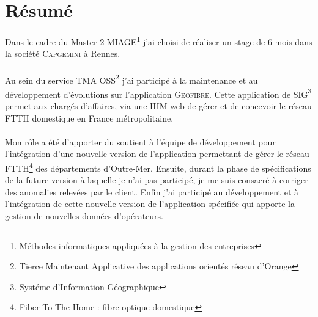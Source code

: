 \chapter*{Résumé}
Dans le cadre du Master 2 MIAGE\footnote{Méthodes informatiques appliquées à la gestion des entreprises}
 j'ai choisi de réaliser un stage de 6 mois dans la société \textsc{Capgemini} à Rennes.
\\\\
Au sein du service TMA OSS\footnote{Tierce Maintenant Applicative des applications orientés réseau d'Orange} j'ai participé à la maintenance et au développement d'évolutions sur l'application \textsc{Geofibre}.
Cette application de SIG\footnote{Systéme d'Information Géographique} permet aux chargés d'affaires, via une IHM web de gérer et de concevoir le réseau FTTH domestique en France métropolitaine.
\\\\
Mon rôle a été d'apporter du soutient à l'équipe de développement pour l'intégration d'une nouvelle version de l'application
permettant de gérer le réseau FTTH\footnote{Fiber To The Home : fibre optique domestique} des départements d'Outre-Mer.
Ensuite, durant la phase de spécifications de la future version à laquelle je n'ai pas participé, je me suis consacré à corriger des anomalies relevées par le client.
Enfin j'ai participé au développement et à l'intégration de cette nouvelle version de l'application spécifiée qui apporte la gestion de nouvelles données d'opérateurs.
